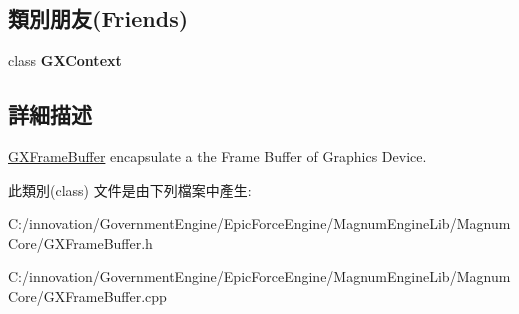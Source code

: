 \subsection*{類別朋友(Friends)}
\begin{DoxyCompactItemize}
\item 
class {\bfseries G\+X\+Context}\hypertarget{class_i_dream_sky_1_1_g_x_frame_buffer_a2c36d7f8865080802bbad88cd73d871c}{}\label{class_i_dream_sky_1_1_g_x_frame_buffer_a2c36d7f8865080802bbad88cd73d871c}

\end{DoxyCompactItemize}


\subsection{詳細描述}
\hyperlink{class_i_dream_sky_1_1_g_x_frame_buffer}{G\+X\+Frame\+Buffer} encapsulate a the Frame Buffer of Graphics Device. 

此類別(class) 文件是由下列檔案中產生\+:\begin{DoxyCompactItemize}
\item 
C\+:/innovation/\+Government\+Engine/\+Epic\+Force\+Engine/\+Magnum\+Engine\+Lib/\+Magnum\+Core/G\+X\+Frame\+Buffer.\+h\item 
C\+:/innovation/\+Government\+Engine/\+Epic\+Force\+Engine/\+Magnum\+Engine\+Lib/\+Magnum\+Core/G\+X\+Frame\+Buffer.\+cpp\end{DoxyCompactItemize}
